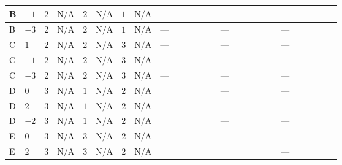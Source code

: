 \documentclass[8pt]{article}
\begin{document}
\begin{landscape}
\begin{longtable}{@{}llcccccc >{\raggedright\arraybackslash}p{0.21\linewidth} >{\raggedright\arraybackslash}p{0.21\linewidth} >{\raggedright\arraybackslash}p{0.21\linewidth}@{}}
\midrule
B & $-1$ & $2$ & $\text{N/A}$ & $2$ & $\text{N/A}$ & $1$ & $\text{N/A}$ & --- & --- & --- \\
\midrule
B & $-3$ & $2$ & $\text{N/A}$ & $2$ & $\text{N/A}$ & $1$ & $\text{N/A}$ & --- & --- & --- \\
\midrule
C & $1$ & $2$ & $\text{N/A}$ & $2$ & $\text{N/A}$ & $3$ & $\text{N/A}$ & --- & --- & --- \\
\midrule
C & $-1$ & $2$ & $\text{N/A}$ & $2$ & $\text{N/A}$ & $3$ & $\text{N/A}$ & --- & --- & --- \\
\midrule
C & $-3$ & $2$ & $\text{N/A}$ & $2$ & $\text{N/A}$ & $3$ & $\text{N/A}$ & --- & --- & --- \\
\midrule
D & $0$ & $3$ & $\text{N/A}$ & $1$ & $\text{N/A}$ & $2$ & $\text{N/A}$ & \scriptsize\adjustbox{max width=\linewidth}{$\begin{gathered} +{m_1^2} (8 {\lambda_{S_1}^{(1)}}+4 {\lambda_{S_1}^{(A)}})\end{gathered}$} & --- & --- \\
\midrule
D & $2$ & $3$ & $\text{N/A}$ & $1$ & $\text{N/A}$ & $2$ & $\text{N/A}$ & \scriptsize\adjustbox{max width=\linewidth}{$\begin{gathered} +{m_1^2} (8 {\lambda_{S_1}^{(1)}}+4 {\lambda_{S_1}^{(A)}})\end{gathered}$} & --- & --- \\
\midrule
D & $-2$ & $3$ & $\text{N/A}$ & $1$ & $\text{N/A}$ & $2$ & $\text{N/A}$ & \scriptsize\adjustbox{max width=\linewidth}{$\begin{gathered} +{m_1^2} (8 {\lambda_{S_1}^{(1)}}+4 {\lambda_{S_1}^{(A)}})\end{gathered}$} & --- & --- \\
\midrule
E & $0$ & $3$ & $\text{N/A}$ & $3$ & $\text{N/A}$ & $2$ & $\text{N/A}$ & \scriptsize\adjustbox{max width=\linewidth}{$\begin{gathered} +{m_1^2} (8 {\lambda_{S_1}^{(1)}}+4 {\lambda_{S_1}^{(A)}})\end{gathered}$} & \scriptsize\adjustbox{max width=\linewidth}{$\begin{gathered} +{m_2^2} (6 {\lambda_{12}^{(1)}}+4 {\lambda_{12}^{(\times)}})\end{gathered}$} & --- \\
\midrule
E & $2$ & $3$ & $\text{N/A}$ & $3$ & $\text{N/A}$ & $2$ & $\text{N/A}$ & \scriptsize\adjustbox{max width=\linewidth}{$\begin{gathered} +{m_1^2} (8 {\lambda_{S_1}^{(1)}}+4 {\lambda_{S_1}^{(A)}})\end{gathered}$} & \scriptsize\adjustbox{max width=\linewidth}{$\begin{gathered} +{m_2^2} (6 {\lambda_{12}^{(1)}}+4 {\lambda_{12}^{(\times)}})\end{gathered}$} & --- \\

\end{longtable}
\end{landscape}
\end{document}
